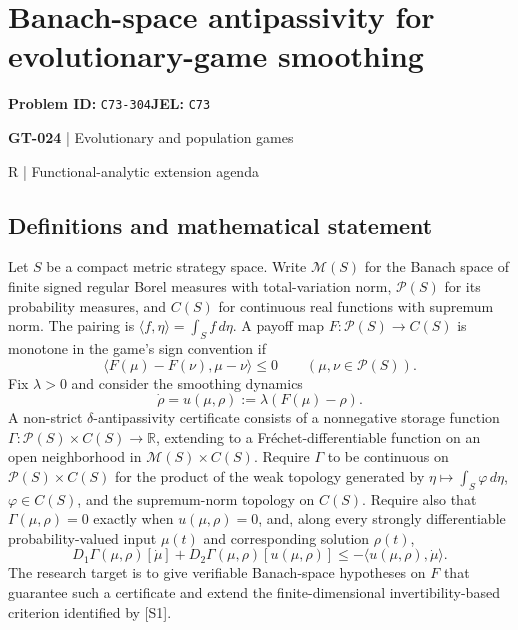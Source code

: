 \documentclass[11pt,a4paper]{article}
\begin{document}
\section*{Banach-space antipassivity for evolutionary-game smoothing}
\textbf{Problem ID:} \texttt{C73-304}\quad \textbf{JEL:} \texttt{C73}\par
\label{problem:OP-0154}
\label{game:GT-024}
{\sffamily\small\color{muted}
{\sffamily\small\color{muted}\textbf{GT-024} | Evolutionary and population games\par R | Functional-analytic extension agenda\par}
\par}
\subsection*{Definitions and mathematical statement}
Let $S$ be a compact metric strategy space. Write $\mathcal M(S)$ for the Banach space of finite signed regular Borel measures with total-variation norm, $\mathcal P(S)$ for its probability measures, and $C(S)$ for continuous real functions with supremum norm. The pairing is $\langle f,\eta\rangle=\int_S f\,d\eta$. A payoff map $F:\mathcal P(S)\to C(S)$ is monotone in the game's sign convention if
\[
 \langle F(\mu)-F(\nu),\mu-\nu\rangle\leq0
 \qquad(\mu,\nu\in\mathcal P(S)).
\]
Fix $\lambda>0$ and consider the smoothing dynamics
\[
 \dot\rho=u(\mu,\rho):=\lambda(F(\mu)-\rho).
\]
A non-strict $\delta$-antipassivity certificate consists of a nonnegative storage function $\Gamma:\mathcal P(S)\times C(S)\to\mathbb R$, extending to a Fr\'echet-differentiable function on an open neighborhood in $\mathcal M(S)\times C(S)$. Require $\Gamma$ to be continuous on $\mathcal P(S)\times C(S)$ for the product of the weak topology generated by $\eta\mapsto\int_S\varphi\,d\eta$, $\varphi\in C(S)$, and the supremum-norm topology on $C(S)$. Require also that $\Gamma(\mu,\rho)=0$ exactly when $u(\mu,\rho)=0$, and, along every strongly differentiable probability-valued input $\mu(t)$ and corresponding solution $\rho(t)$,
\[
 D_1\Gamma(\mu,\rho)[\dot\mu]+D_2\Gamma(\mu,\rho)[u(\mu,\rho)]
 \leq-\langle u(\mu,\rho),\dot\mu\rangle.
\]
The research target is to give verifiable Banach-space hypotheses on $F$ that guarantee such a certificate and extend the finite-dimensional invertibility-based criterion identified by [S1].
\end{document}
